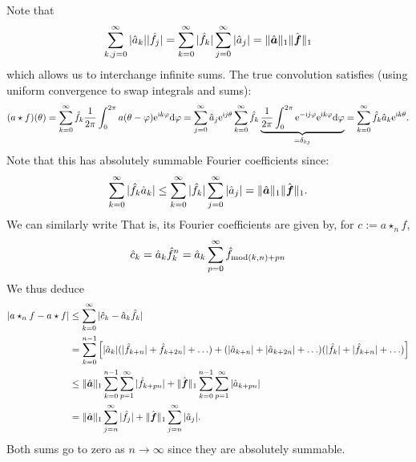 \documentclass[12pt,a4paper]{article}
\def\a{ {\vc a} }
\def\f{ {\vc f} }
\begin{document}
Note that
\[
\ensuremath{\sum}_{k,j=0}^\ensuremath{\infty} |\hat{a}_k| |\hat{f}_j| =  \ensuremath{\sum}_{k=0}^\ensuremath{\infty} |\hat{f}_k| \ensuremath{\sum}_{j=0}^\ensuremath{\infty} |\hat{a}_j| = \|\hat{\a}\|_1 \| \hat{\f}\|_1
\]
which allows us to interchange infinite sums. The true convolution satisfies (using uniform convergence to swap integrals and sums):
\[
(a \star f)(\theta) = \sum_{k=0}^\infty  \hat{f}_k {1 \over 2\pi} \int_0^{2\pi} a(\theta-\varphi) {\rm e}^{{\rm i} k \varphi} {\rm d} \varphi =  \sum_{j=0}^\infty \hat{a}_j {\rm e}^{{\rm i} j \theta}   \sum_{k=0}^\infty \hat{f}_k \underbrace{{1 \over 2\pi} \int_0^{2\pi} {\rm e}^{-{\rm i} j \varphi} {\rm e}^{{\rm i} k \varphi} {\rm d} \varphi}_{=\delta_{kj}}  = \sum_{k=0}^\infty \hat{f}_k \hat{a}_k {\rm e}^{{\rm i} k \theta}.
\]
Note that this has absolutely summable Fourier coefficients  since:
\[
\ensuremath{\sum}_{k=0}^\ensuremath{\infty} |\hat{f}_k \hat{a}_k| \ensuremath{\leq} \ensuremath{\sum}_{k=0}^\ensuremath{\infty} |\hat{f}_k| \ensuremath{\sum}_{j=0}^\ensuremath{\infty} |\hat{a}_j| = \|\hat{\a}\|_1 \| \hat{\f}\|_1.
\]
We can similarly write
That is, its Fourier coefficients are given by, for $c := a \ensuremath{\star}_n f$,
\[
\hat{c}_k = \hat{a}_k \hat{f}_k^n = \hat{a}_k \ensuremath{\sum}_{p=0}^\ensuremath{\infty} \hat{f}_{{\rm mod}(k,n)+pn}
\]
We thus deduce
\begin{align*}
|a \ensuremath{\star}_n f - a \ensuremath{\star} f| &\ensuremath{\leq} \ensuremath{\sum}_{k=0}^\ensuremath{\infty} |\hat{c}_k - \hat{a}_k \hat{f}_k| \ccr
= \ensuremath{\sum}_{k=0}^{n-1} \br[|\hat{a}_k| (|\hat{f}_{k+n}| + \hat{f}_{k+2n}| + \ensuremath{\ldots}) +
 (|\hat{a}_{k+n}| + |\hat{a}_{k+2n}| + \ensuremath{\ldots}) (|\hat{f}_k| + |\hat{f}_{k+n}| + \ensuremath{\ldots})]\\
 & \ensuremath{\leq}
 \| \hat{\a} \|_1 \ensuremath{\sum}_{k=0}^{n-1}  \ensuremath{\sum}_{p=1}^\ensuremath{\infty} |\hat{f}_{k+pn}| + \|\hat{\f}\|_1 \ensuremath{\sum}_{k=0}^{n-1}  \ensuremath{\sum}_{p=1}^\ensuremath{\infty} |\hat{a}_{k+pn}| \ccr
 = \| \hat{\a} \|_1 \ensuremath{\sum}_{j=n}^\ensuremath{\infty} |\hat{f}_j| + \|\hat{\f}\|_1 \ensuremath{\sum}_{j=n}^\ensuremath{\infty} |\hat{a}_j|.
\end{align*}
Both sums go to zero as $n \ensuremath{\rightarrow} \ensuremath{\infty}$ since they are absolutely summable.
\end{document}
